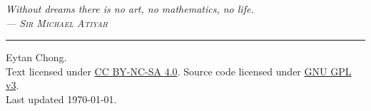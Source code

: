\begin{titlepage}
    \vspace*{\fill}

    \begin{flushright}
		\large\itshape
        Without dreams there is no art, no mathematics, no life.\\[0.8cm]
		--- \textsc{Sir Michael Atiyah}
	\end{flushright}
    
    \vspace*{\fill}
    \hrule
    \medbreak
    {\small
    \noindent {\copyright} {\the\year} Eytan Chong.\\
    \noindent Text licensed under \href{https://creativecommons.org/licenses/by-nc-sa/4.0/}{CC BY-NC-SA 4.0}. Source code licensed under \href{https://www.gnu.org/licenses/gpl-3.0-standalone.html}{GNU GPL v3}.\\[0.4cm]
    \noindent Last updated \today.
    }
\end{titlepage}